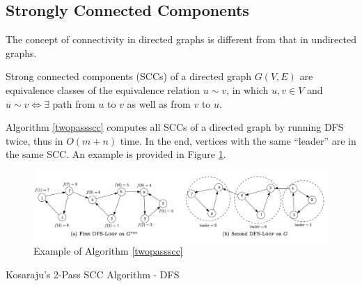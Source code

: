 \subsection{Strongly Connected Components}
The concept of connectivity in directed graphs is different from that in undirected graphs.
\begin{definition}
Strong connected components (SCCs) of a directed graph $G(V,E)$ are equivalence classes of the equivalence relation $u\sim v$, in which $u,v\in V$ and $u\sim v\iff\exists$ path from $u$ to $v$ as well as from $v$ to $u$.
\end{definition}
Algorithm \ref{twopassscc} computes all SCCs of a directed graph by running DFS twice, thus in $O(m+n)$ time. In the end, vertices with the same ``leader'' are in the same SCC. An example is provided in Figure \ref{egscc}.
\begin{figure}[ht]
\centering
\includegraphics[width=\textwidth]{egscc.jpg}
\caption{Example of Algorithm \ref{twopassscc}}\label{egscc}
\end{figure}
\begin{algorithm}[ht]
\caption{Kosaraju's 2-Pass SCC Algorithm - DFS}\label{twopassscc}
\begin{algorithmic}[1]
\Input{}
\Output{}
\EndIf
\EndFor
\EndFunction
{}
\EndIf
{}
\EndFor
\EndFunction
\end{algorithmic}
\end{algorithm}

